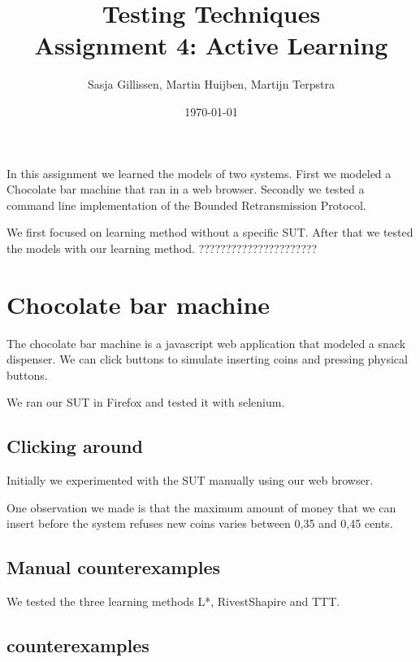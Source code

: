 \documentclass[11pt,a4paper]{article}
\author{Sasja Gillissen, Martin Huijben, Martijn Terpstra}
\date{\today}
\title{Testing Techniques\\
  \textbf{Assignment 4: Active Learning}}
\begin{document}
\maketitle

In this assignment we learned the models of two systems. First we
modeled a Chocolate bar machine that ran in a web browser. Secondly we
tested a command line implementation of the Bounded Retransmission Protocol.

We first focused on learning method without a specific SUT. After that
we tested the models with our learning method. ??????????????????????

\iffalse
\section{Learning methods}
section{Differences learning methods}
and TTT Bounded


We found that TTT found counterexamples that L* and RiverShapire did


\fi
\section{Chocolate bar machine}
The chocolate bar machine is a javascript web application that modeled
a snack dispenser. We can click buttons to simulate inserting coins
and pressing physical buttons.
                                                                
We ran our SUT in Firefox and tested it with selenium.

\subsection{Clicking around}
Initially we experimented with the SUT manually using our web browser.

One observation we made is that the maximum amount of money that we
can insert before the system refuses new coins varies between 0,35 and
0,45 cents.

\subsection{Manual counterexamples}
We tested the three learning methods L*, RivestShapire and TTT. 

\subsection{counterexamples}
\end{document}
